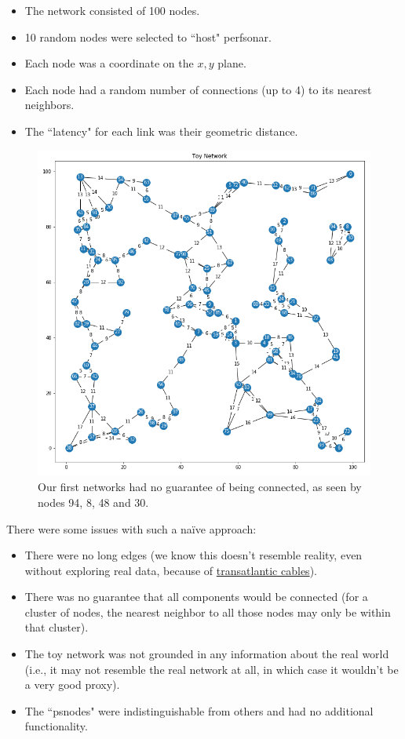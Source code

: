 \documentclass{finalreport}
\begin{document}
\begin{itemize}
	\item The network consisted of 100 \glspl{node}.
	\item 10 random nodes were selected to ``host" \gls{perfsonar}.
    \item Each node was a coordinate on the $x,y$ plane.
	\item Each node had a random number of connections (up to 4) to its nearest neighbors.
	\item The ``\gls{latency}" for each link was their geometric distance.
\end{itemize}

\begin{figure}[!ht]
\centering
\includegraphics[width=.8\linewidth]{week_1/Network_416b9f8671a64f04a87bbb59c431dc28.png}
\caption{Our first networks had no guarantee of being \gls{connected}, as seen by nodes 94, 8, 48 and 30.}
\end{figure}

\noindent There were some issues with such a na{\"i}ve approach:

\begin{itemize}
    \item There were no long edges (we know this doesn't resemble reality, even without exploring real data, because of \href{https://en.wikipedia.org/wiki/Transatlantic_communications_cable}{transatlantic cables}).
    \item There was no guarantee that all \glspl{component} would be \gls{connected} (for a cluster of nodes, the nearest neighbor to all those nodes may only be within that cluster).
    \item The toy network was not grounded in any information about the real world (i.e., it may not resemble the real network at all, in which case it wouldn't be a very good proxy).
    \item The ``\glspl{psnode}" were indistinguishable from others and had no additional functionality.
\end{itemize}
\end{document}
